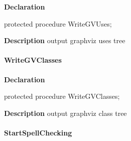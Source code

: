 \documentclass{report}
\newif\ifpdf
\begin{document}
\label{PasDoc_Gen.TDocGenerator-WriteGVUses}
\begin{list}{}{
\setlength{\itemindent}{0cm}
\setlength{\listparindent}{0cm}
\setlength{\leftmargin}{\evensidemargin}
\addtolength{\leftmargin}{\tmplength}
\settowidth{\labelsep}{X}
\addtolength{\leftmargin}{\labelsep}
\setlength{\labelwidth}{\tmplength}
}
\item[\textbf{Declaration}\hfill]
\ifpdf
\begin{flushleft}
\fi
\begin{ttfamily}
protected procedure WriteGVUses;\end{ttfamily}

\ifpdf
\end{flushleft}
\fi

\par
\item[\textbf{Description}]
output graphviz uses tree

\end{list}
\paragraph*{WriteGVClasses}\hspace*{\fill}

\label{PasDoc_Gen.TDocGenerator-WriteGVClasses}
\begin{list}{}{
\setlength{\itemindent}{0cm}
\setlength{\listparindent}{0cm}
\setlength{\leftmargin}{\evensidemargin}
\addtolength{\leftmargin}{\tmplength}
\settowidth{\labelsep}{X}
\addtolength{\leftmargin}{\labelsep}
\setlength{\labelwidth}{\tmplength}
}
\item[\textbf{Declaration}\hfill]
\ifpdf
\begin{flushleft}
\fi
\begin{ttfamily}
protected procedure WriteGVClasses;\end{ttfamily}

\ifpdf
\end{flushleft}
\fi

\par
\item[\textbf{Description}]
output graphviz class tree

\end{list}
\paragraph*{StartSpellChecking}\hspace*{\fill}
\end{document}
